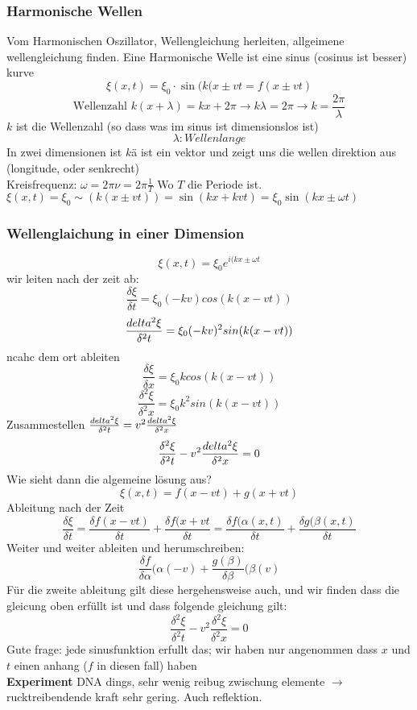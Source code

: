 \documentclass{article}
\newcommand{\experiment}{\\[2ex]\textbf{Experiment }}
\begin{document}
\subsubsection{Harmonische Wellen} Vom Harmonischen Oszillator, Wellengleichung herleiten, allgeimene wellengleichung finden. Eine Harmonische Welle ist eine sinus (cosinus ist besser) kurve
\[\xi(x,t)=\xi_0\cdot\sin(k(x\pm vt=f(x\pm vt)\]
\[\text{Wellenzahl }k(x+\lambda)=kx+2\pi \rightarrow k\lambda = 2\pi \rightarrow k=\frac{2\pi}{\lambda}\]
$k$ ist die Wellenzahl (so dass was im sinus ist dimensionslos ist)  \[\lambda:{Wellenlange}\]
In zwei dimensionen ist $k$ä ist ein vektor und zeigt uns die wellen direktion aus (longitude, oder senkrecht)
\\Kreisfrequenz: $\omega=2\pi\nu=2\pi\frac{1}{T}$ Wo $T$ die Periode ist.\\$\xi(x,t)=\xi_0\sim(k(x\pm vt))=\sin(kx+kvt)=\xi_0\sin(kx\pm\omega t)$
\subsubsection{Wellenglaichung in einer Dimension}
\[\xi(x,t)=\xi_0e^{i(kx\pm \omega t}\]
wir leiten nach der zeit ab:
\[\frac{\delta\xi}{\delta t}=\xi_0(-kv)cos(k(x-vt))\]
\[\frac{\\delta^2\xi}{\delta^2t}=\xi_0(-kv)^2sin(k(x-vt))\]
ncahc dem ort ableiten
\[\frac{\delta\xi}{\delta x}=\xi_0kcos(k(x-vt))\]
\[\frac{\delta^2\xi}{\delta^2x}=\xi_0k^2sin(k(x-vt))\]
Zusammestellen $\frac{\\delta^2\xi}{\delta^2t}=v^2\frac{\\delta^2\xi}{\delta^2x}$
\[\frac{\delta^2\xi}{\delta^2t}-v^2\frac{\\delta^2\xi}{\delta^2x}=0\]
Wie sieht dann die algemeine lösung aus?
\[\xi(x,t)=f(x-vt)+g(x+vt)\]
Ableitung nach der Zeit
\[\frac{\delta\xi}{\delta t}=\frac{\delta f(x-vt)}{\delta t}+\frac{\delta f(x+vt}{\delta t}=\frac{\delta f(\alpha(x,t)}{\delta t}+\frac{\delta g(\beta(x,t)}{\delta t}\]
Weiter und weiter ableiten und herumschreiben:
\[\frac{\delta f}{\delta \alpha}(\alpha(-v)+\frac{g(\beta)}{\delta \beta}(\beta(v)\]
Für die zweite ableitung gilt diese hergehensweise auch, und wir finden dass die gleicung oben erfüllt ist und dass folgende gleichung gilt:
\[\frac{\delta^2\xi}{\delta^2t}-v^2\frac{\delta^2\xi}{\delta^2x}=0\]
Gute frage: jede sinusfunktion erfullt das; wir haben nur angenommen dass $x$ und $t$ einen anhang ($f$ in diesen fall) haben
\experiment DNA dings, sehr wenig reibug zwischung elemente $\rightarrow$ rucktreibendende kraft sehr gering. Auch reflektion. 
\end{document}
